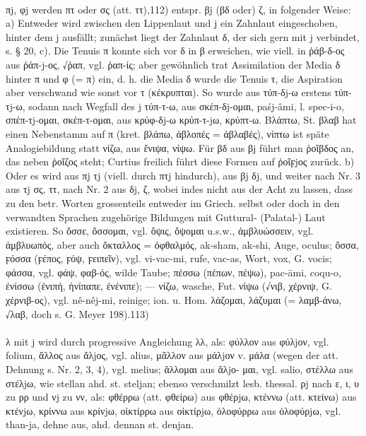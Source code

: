   \paragraph{} πj, φj werden πτ oder σς (att. ττ),112) entspr. βj
  (βδ oder) ζ, in folgender Weise: a) Entweder wird zwischen den Lippenlaut und
  j ein Zahnlaut eingeschoben, hinter dem j ausfällt; zunächst liegt der
  Zahnlaut δ, der sich gern mit j verbindet, s. § 20, c). Die Tenuis π konnte
  sich vor δ in β erweichen, wie viell. in ῥάβ-δ-ος aus ῥάπ-j-ος, √ῥαπ,
  vgl. ῥαπ-ίς; aber gewöhnlich trat Assimilation der Media δ hinter π und φ (=
  π) ein, d. h. die Media δ wurde die Tenuis τ, die Aspiration aber verschwand
  wie sonst vor τ (κέκρυπται). So wurde aus τύπ-δj-ω erstens τύπ-τj-ω, sodann
  nach Wegfall des j τύπ-τ-ω, aus σκέπ-δj-ομαι,  paśj-âmi, l.
  spec-i-o, σπέπ-τj-ομαι, σκέπ-τ-ομαι, aus κρύφ-δj-ω κρύπ-τ-jω, κρύπτ-ω. Βλάπτω,
  St. βλαβ hat einen Nebenstamm auf π (kret. βλάπω, ἀβλοπές = ἀβλαβές), νίπτω
  ist späte Analogiebildung statt νίζω, aus ἔνιψα, νίψω. Für βδ aus βj führt man
  ῥοῖβδος an, das neben ῥοῖζος steht; Curtius freilich führt diese Formen auf
  ῥοῖϝjος zurück. b) Oder es wird aus πj τj (viell. durch πτj hindurch), aus βj
  δj, und weiter nach Nr. 3 aus τj σς, ττ, nach Nr. 2 aus δj, ζ, wobei indes
  nicht aus der Acht zu lassen, dass zu den betr. Worten grossenteils entweder
  im Griech. selbst oder doch in den verwandten Sprachen zugehörige Bildungen
  mit Guttural- (Palatal-) Laut existieren. So ὄσσε, ὄσσομαι, vgl. ὄψις, ὄψομαι
  u.s.w., ἀμβλυώσσειν, vgl. ἀμβλυωπός, aber auch  ὄκταλλος = ὀφθαλμός,
   ak-sham, ak-shi, Auge,  oculus; ὄσσα, ϝόσσα (ϝέπος, ϝόψ, ϝειπεῖν), vgl.
   vi-vac-mi, rufe, vac-as, Wort,  vox, G. vocis; φάσσα, vgl.
  φάψ, φαβ-ός, wilde Taube; πέσσω (πέπων, πέψω),  pac-āmi,  coqu-o,
  ἐνίσσω (ἐνιπή, ἠνίπαπε, ἐνένιπε); — νίζω, wasche, Fut. νίψω (√νιβ,
  χέρνιψ, G. χέρνιβ-ος), vgl.  nê-nêj-mi, reinige; ion. u. Hom. λάζομαι,
  λάζυμαι (= λαμβ-άνω, √λαβ, doch s. G. Meyer 198).113) 

  \paragraph{} λ mit j wird
  durch progressive Angleichung λλ, als: φύλλον aus φύλjον, vgl. folium, ἄλλος
  aus ἄλjος, vgl. alius, μᾶλλον aus μάλjον v. μάλα (wegen der att. Dehnung s.
  Nr. 2, 3, 4), vgl. melius; ἅλλομαι aus ἅλjο- μαι, vgl. salio, στέλλω aus
  στέλjω, wie stellan ahd. st. steljan; ebenso verschmilzt lesb. thessal. ρj
  nach ε, ι, υ zu ρρ und νj zu νν, als: φθέρρω (att. φθείρω) aus φθέρjω, κτέννω
  (att. κτείνω) aus κτένjω, κρίννω aus κρίνjω, οἰκτίρρω aus οἰκτίρjω, ὀλοφύρρω
  aus ὀλοφύρjω, vgl.  than-ja, dehne aus, ahd. dennan st. denjan. 

